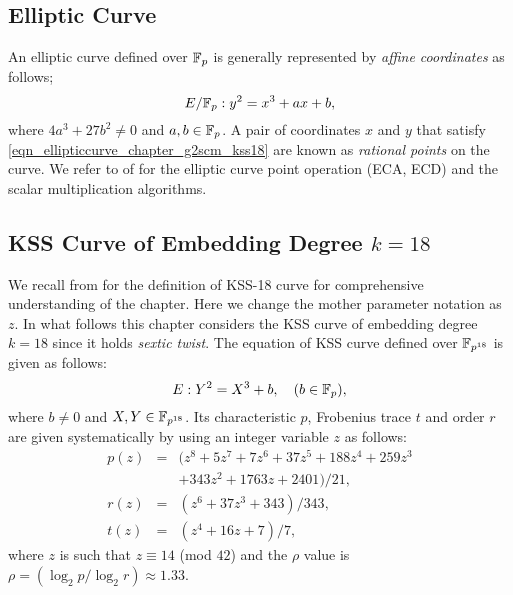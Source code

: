 \subsection{Elliptic Curve}
An elliptic curve \cite{washington2003elliptic} defined over ${\mathbb{F}}_{p}$ is generally represented by \textit{affine coordinates} \cite{Silverman} as follows;
\begin{equation}\label{eqn_ellipticcurve_chapter_g2scm_kss18}
E/{\mathbb{F}}_{p} : y^2=x^3+ax+b,
\end{equation}
where $ 4a^3+27b^2 \neq 0$ and $a,b \in {\mathbb{F}}_{p}$. A pair of coordinates $x$ and $y$ that satisfy \eqref{eqn_ellipticcurve_chapter_g2scm_kss18} are known as \textit{rational points} on the curve. 
We refer to  of  for the elliptic curve point operation (ECA, ECD) and the scalar multiplication algorithms.


\subsection{KSS Curve of Embedding Degree \texorpdfstring{$k=18$}{\textit{k=18}}}
We recall  from  for the definition of KSS-18 curve for comprehensive understanding of the chapter.
Here we change the mother parameter notation as $z$.
In what follows this chapter considers the KSS curve of  embedding degree $k=18$ since it holds \textit{sextic twist}. 
The equation of KSS curve defined over $\mathbb{F}_{p^{18}}$ is given as follows:
\begin{equation}\label{eqn_kss18curve_chapter_g2scm_kss18}
E:Y^2=X^3+b, \quad \mbox{($b \in {\mathbb{F}}_{p}$)},
\end{equation}
where $b \neq 0$ and $X,Y \in \mathbb{F}_{p^{18}}$. Its characteristic $p$, Frobenius trace $t$ and order $r$ are given systematically by using an integer variable $z$ as follows:
\begin{subequations}
\begin{eqnarray}
p(z) &= & (z^8 +5z^7 +7z^6 +37z^5 +188z^4 +259z^3  \nonumber \\ 								
& & + 343z^2 +1763z+2401)/21,\\\label{eq:kss_char_chapter_g2scm_kss18}
r(z) &= &(z^6 + 37z^3 + 343)/343,\label{eq:kss_degree_chapter_g2scm_kss18}  \\
t(z) &=& (z^4 + 16z + 7)/7, \label{eq:kss_trace_chapter_g2scm_kss18} 
\end{eqnarray}
\end{subequations} 
where $z$ is such that $z \equiv 14$ (mod $42$) and the $\rho$ value is $\rho = (\log_2 p/\log_2 r) \approx 1.33$.


